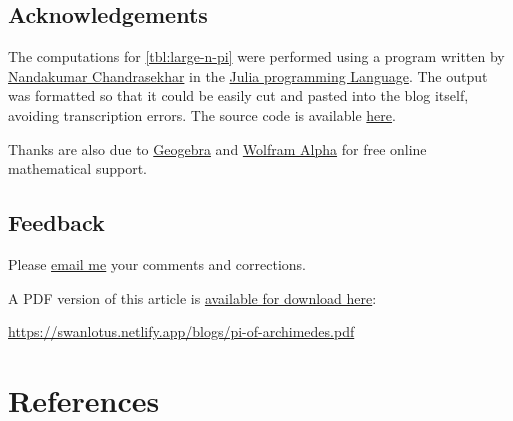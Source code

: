 \documentclass[
  a4paper,
]{article}
\begin{document}
\subsection{Acknowledgements}\label{acknowledgements}

The computations for \cref{tbl:large-n-pi} were performed using a
program written by
\href{https://www.linkedin.com/in/nandakumar-chandrasekhar-a400b45b/}{Nandakumar
Chandrasekhar} in the \href{https://julialang.org/}{Julia programming
Language}. The output was formatted so that it could be easily cut and
pasted into the blog itself, avoiding transcription errors. The source
code is available \href{auxiliary/pi_approximations.jl}{here}.

Thanks are also due to \href{https://www.geogebra.org/}{Geogebra} and
\href{https://www.wolframalpha.com/}{Wolfram Alpha} for free online
mathematical support.

\subsection{Feedback}\label{feedback}

Please \href{mailto:feedback.swanlotus@gmail.com}{email me} your
comments and corrections.

\noindent A PDF version of this article is
\href{./pi-of-archimedes.pdf}{available for download here}:

\url{https://swanlotus.netlify.app/blogs/pi-of-archimedes.pdf}

\section*{References}\label{bibliography}
\end{document}
